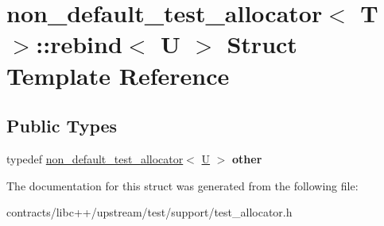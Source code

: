 \hypertarget{structnon__default__test__allocator_1_1rebind}{}\section{non\+\_\+default\+\_\+test\+\_\+allocator$<$ T $>$\+:\+:rebind$<$ U $>$ Struct Template Reference}
\label{structnon__default__test__allocator_1_1rebind}
\subsection*{Public Types}
\begin{DoxyCompactItemize}
\item 
\mbox{\label{structnon__default__test__allocator_1_1rebind_a4455d022a5fefb5affd2de4763562c16}} 
typedef \mbox{\hyperlink{classnon__default__test__allocator}{non\+\_\+default\+\_\+test\+\_\+allocator}}$<$ \mbox{\hyperlink{union_u}{U}} $>$ {\bfseries other}
\end{DoxyCompactItemize}


The documentation for this struct was generated from the following file\+:\begin{DoxyCompactItemize}
\item 
contracts/libc++/upstream/test/support/test\+\_\+allocator.\+h\end{DoxyCompactItemize}
